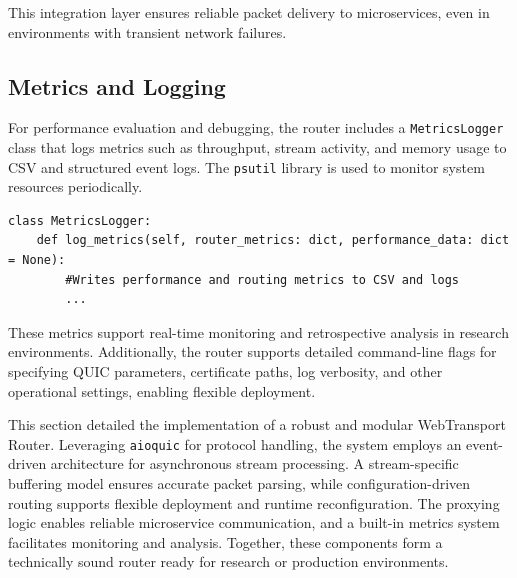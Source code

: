 This integration layer ensures reliable packet delivery to microservices, even in environments with transient network failures.

\subsection{Metrics and Logging}
For performance evaluation and debugging, the router includes a \texttt{MetricsLogger} class that logs metrics such as throughput, stream activity, and memory usage to CSV and structured event logs. The \texttt{psutil} library is used to monitor system resources periodically.

\begin{lstlisting}[breaklines=true,basicstyle=\small\ttfamily,frame=single]
class MetricsLogger:
    def log_metrics(self, router_metrics: dict, performance_data: dict = None):
        #Writes performance and routing metrics to CSV and logs
        ...
\end{lstlisting}

These metrics support real-time monitoring and retrospective analysis in research environments. Additionally, the router supports detailed command-line flags for specifying QUIC parameters, certificate paths, log verbosity, and other operational settings, enabling flexible deployment.

This section detailed the implementation of a robust and modular WebTransport Router. Leveraging \texttt{aioquic} for protocol handling, the system employs an event-driven architecture for asynchronous stream processing. A stream-specific buffering model ensures accurate packet parsing, while configuration-driven routing supports flexible deployment and runtime reconfiguration. The proxying logic enables reliable microservice communication, and a built-in metrics system facilitates monitoring and analysis. Together, these components form a technically sound router ready for research or production environments.








